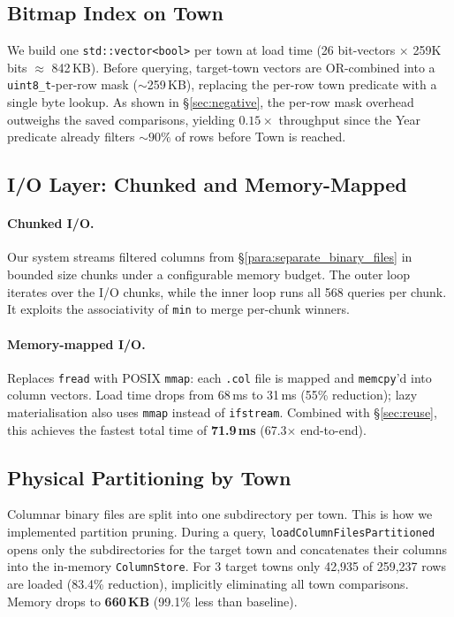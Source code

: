 \documentclass[11pt,a4paper]{article}
\begin{document}
\subsection{Bitmap Index on Town}\label{sec:bitmap}
We build one \texttt{std::vector<bool>} per town at load time (26 bit-vectors $\times$ 259K bits $\approx$ 842\,KB).
Before querying, target-town vectors are OR-combined into a \texttt{uint8\_t}-per-row mask ($\sim$259\,KB), replacing the per-row town predicate with a single byte lookup.
As shown in \S\ref{sec:negative}, the per-row mask overhead outweighs the saved comparisons, yielding $0.15\times$ throughput since the Year predicate already filters ${\sim}90\%$ of rows before Town is reached.

\subsection{I/O Layer: Chunked and Memory-Mapped }\label{sec:io}

\paragraph{Chunked I/O.}
Our system streams filtered columns from \S\ref{para:separate_binary_files} in bounded size chunks under a configurable memory budget.
The outer loop iterates over the I/O chunks, while the inner loop runs all 568 queries per chunk.
It exploits the associativity of \texttt{min} to merge per-chunk winners.

\paragraph{Memory-mapped I/O.}
Replaces \texttt{fread} with POSIX \texttt{mmap}: each \texttt{.col} file is mapped and \texttt{memcpy}'d into column vectors.
Load time drops from 68\,ms to 31\,ms (55\% reduction); lazy materialisation also uses \texttt{mmap} instead of \texttt{ifstream}.
Combined with \S\ref{sec:reuse}, this achieves the fastest total time of \textbf{71.9\,ms} (67.3$\times$ end-to-end).

\subsection{Physical Partitioning by Town}\label{sec:partition}
Columnar binary files are split into one subdirectory per town.
This is how we implemented partition pruning.
During a query, \texttt{loadColumnFilesPartitioned} opens only the subdirectories for the target town and concatenates their columns into the in-memory \texttt{ColumnStore}.
For 3 target towns only 42,935 of 259,237 rows are loaded (83.4\% reduction), implicitly eliminating all town comparisons.
Memory drops to \textbf{660\,KB} (99.1\% less than baseline).
\end{document}
